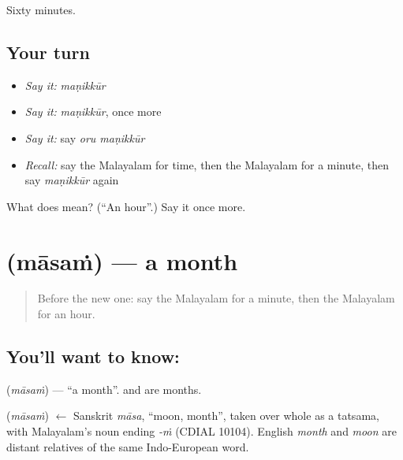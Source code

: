 \begin{grammarlens}[title={What you've built}]
Sixty minutes.
\end{grammarlens}

\subsection*{Your turn}
\begin{itemize}
\raggedright
  \item \emph{Say it:} \emph{maṇikkūr}
  \item \emph{Say it:} \emph{maṇikkūr}, once more
  \item \emph{Say it:} say \emph{oru maṇikkūr}
  \item \emph{Recall:} say the Malayalam for time, then the Malayalam for a minute, then say \emph{maṇikkūr} again
\end{itemize}

\begin{tcolorbox}[breakable,colback=teal!4,colframe=teal!35!black,title={Before you move on}]
What does  mean? (\textquotedblleft{}An hour\textquotedblright{}.) Say it once more.
\end{tcolorbox}
\section[\texorpdfstring{\ml{മാസം} (māsaṁ)}{മാസം (māsaṁ)}]{ (māsaṁ) — a month}

\label{lesson:ML-C139-month}



\begin{quote}
Before the new one: say the Malayalam for a minute, then the Malayalam for an hour.
\end{quote}

\subsection*{You'll want to know: }
\textbf{} (\emph{māsaṁ}) — \textquotedblleft{}a month\textquotedblright{}. \textbf{} and \textbf{} are months.

\begin{cousinweb}
\textbf{} (\emph{māsaṁ}) $\leftarrow$ Sanskrit \emph{māsa}, \textquotedblleft{}moon, month\textquotedblright{}, taken over whole as a tatsama, with Malayalam's noun ending \emph{-ṁ} (CDIAL 10104). English \emph{month} and \emph{moon} are distant relatives of the same Indo-European word.
\end{cousinweb}

